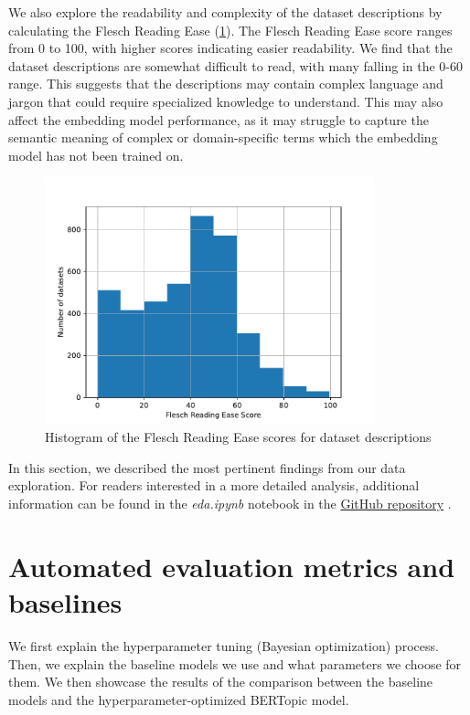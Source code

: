 We also explore the readability and complexity of the dataset descriptions by calculating the Flesch Reading Ease \cite{flesch_new_1948} (\cref{fig:flesch_reading_ease}). The Flesch Reading Ease score ranges from 0 to 100, with higher scores indicating easier readability. We find that the dataset descriptions are somewhat difficult to read, with many falling in the 0-60 range. This suggests that the descriptions may contain complex language and jargon that could require specialized knowledge to understand. This may also affect the embedding model performance, as it may struggle to capture the semantic meaning of complex or domain-specific terms which the embedding model has not been trained on.

\begin{figure}[h]
    \centering
    \includegraphics[width=0.85\textwidth]{figures/flesch_reading_ease.pdf}
    \caption{Histogram of the Flesch Reading Ease scores for dataset descriptions}
    \label{fig:flesch_reading_ease}
\end{figure}

In this section, we described the most pertinent findings from our data exploration. For readers interested in a more detailed analysis, additional information can be found in the \textit{eda.ipynb} notebook in the \href{https://github.com/ivangermanov/openml-tags}{GitHub repository} \cite{germanov_topic_modeling_of_2024}.

\section{Automated evaluation metrics and baselines}
\label{sec:automated_evaluation}
We first explain the hyperparameter tuning (Bayesian optimization) process. Then, we explain the baseline models we use and what parameters we choose for them. We then showcase the results of the comparison between the baseline models and the hyperparameter-optimized BERTopic model.

